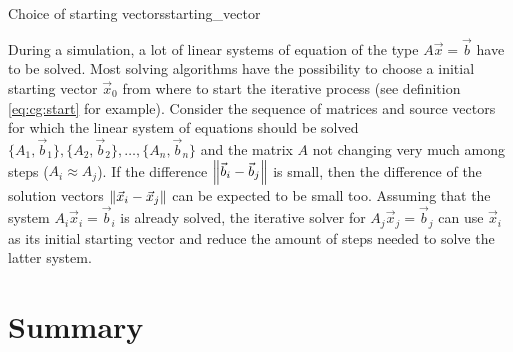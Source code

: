 \documentclass{article}
\theoremstyle{plain} %
\theoremstyle{convention} %
\theoremstyle{remark} %
\numberwithin{equation}{section}
\begin{document}
\begin{proposal}{Choice of starting vectors}{starting_vector} %

During a simulation, a lot of linear systems of equation of the type $A \vec{x} = \vec{b}$ have to be solved. Most solving algorithms have the possibility to choose a initial starting vector $\vec{x}_0$ from where to start the iterative process (see definition \ref{eq:cg:start} for example). Consider the sequence of matrices and source vectors for which the linear system of equations should be solved $\{A_1, \vec{b}_1\}, \{A_2, \vec{b}_2\}, \dots, \{A_n, \vec{b}_n\}$ and the matrix $A$ not changing very much among steps ($A_i \approx A_j$). If the difference $\norm{\vec{b}_i - \vec{b}_j}$ is small, then the difference of the solution vectors $\norm{\vec{x}_i - \vec{x}_j}$ can be expected to be small too. Assuming that the system $A_i \vec{x}_i = \vec{b}_i$ is already solved, the iterative solver for $A_j \vec{x}_j = \vec{b}_j$ can use $\vec{x}_i$ as its initial starting vector and reduce the amount of steps needed to solve the latter system.

\end{proposal}

\section{Summary}
\end{document}
